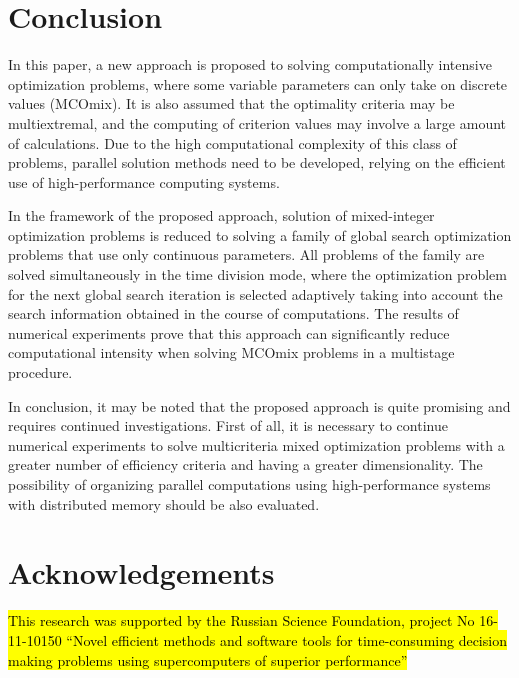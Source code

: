 \documentclass{svproc}
\begin{document}
\section{Conclusion}

In this paper, a new approach is proposed to solving computationally intensive optimization problems, where some variable parameters can only take on discrete values (MCOmix). It is also assumed that the optimality criteria may be multiextremal, and the computing of criterion values may involve a large amount of calculations. Due to the high computational complexity of this class of problems, parallel solution methods need to be developed, relying on the efficient use of high-performance computing systems.

In the framework of the proposed approach, solution of mixed-integer optimization problems is reduced to solving a family of global search optimization problems that use only continuous parameters. All problems of the family are solved simultaneously in the time division mode, where the optimization problem for the next global search iteration is selected adaptively taking into account the search information obtained in the course of computations. The results of numerical experiments prove that  this approach can significantly reduce computational intensity when solving MCOmix problems in a multistage procedure.

In conclusion, it may be noted that the proposed approach is quite promising and requires continued investigations. First of all, it is necessary to continue numerical experiments to solve multicriteria mixed optimization problems with a greater number of efficiency criteria and having a greater dimensionality. The possibility of organizing parallel computations using high-performance systems with distributed memory should be also evaluated.



\section*{Acknowledgements} 
\hl{This research was supported by the Russian Science Foundation, project No 16-11-10150 ``Novel efficient methods and software tools for time-consuming decision making problems using supercomputers of superior performance''}



%

\end{document}
